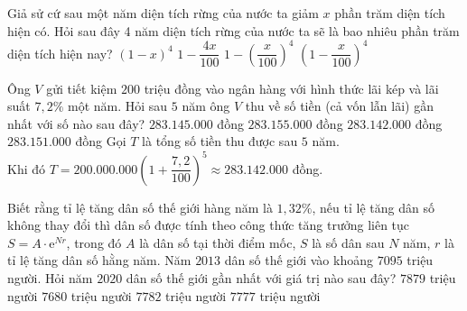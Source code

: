 \begin{ex}%
	Giả sử cứ sau một năm diện tích rừng của nước ta giảm $x$ phần trăm diện tích hiện có. Hỏi sau đây 4 năm diện tích rừng của nước ta sẽ là bao nhiêu phần trăm diện tích hiện nay?
	\choice
	{ $(1-x)^4$}
	{$1-\dfrac{4x}{100}$}
	{$1-\left(\dfrac{x}{100}\right)^4$}
	{\True $\left(1-\dfrac{x}{100}\right)^4$}
\end{ex}

\begin{ex}%
	Ông $V$ gửi tiết kiệm $200$ triệu đồng vào ngân hàng với hình thức lãi kép và lãi suất $7{,}2\%$ một năm. Hỏi sau $5$ năm ông $V$ thu về số tiền (cả vốn lẫn lãi) gần nhất với số nào sau đây?
	\choice
	{$283.145.000$ đồng}
	{$283.155.000$ đồng}
	{\True $283.142.000$ đồng}
	{$283.151.000$ đồng}
	\loigiai
	{Gọi $T$ là tổng số tiền thu được sau $5$ năm. \\
		Khi đó $T=200.000.000\left(1+\dfrac{7{,}2}{100}\right)^5 \approx 283.142.000$ đồng.}
\end{ex}

\begin{ex}%
	Biết rằng tỉ lệ tăng dân số thế giới hàng năm là $1{,}32\%$, nếu tỉ lệ tăng dân số không thay đổi thì dân số được tính theo công thức tăng trưởng liên tục $S=A\cdot \mathrm{e}^{Nr}$, trong đó $A$ là dân số tại thời điểm mốc, $S$ là số dân sau $N$ năm, $r$ là tỉ lệ tăng dân số hằng năm. Năm $2013$ dân số thế giới vào khoảng $7095$ triệu người. Hỏi  năm $2020$ dân số thế giới gần nhất với giá trị nào sau đây?
	\choice
	{$7879$ triệu người}
	{$7680$ triệu người}
	{\True $7782$ triệu người}
	{$7777$ triệu người}
\end{ex}

